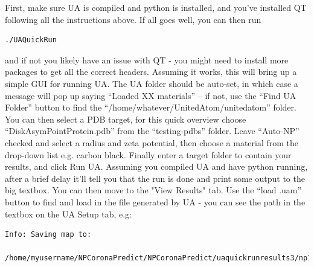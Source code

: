 \documentclass[10pt,a4paper,onecolumn]{report}
\begin{document}
First, make sure UA is compiled and python is installed, and you've installed QT following all the instructions above. 
If all goes well, you can then run
\begin{lstlisting}
./UAQuickRun
\end{lstlisting}
and if not you likely have an issue with QT - you might need to install more packages to get all the correct headers. Assuming it works, this will bring up a simple GUI for running UA. The UA folder should be auto-set, in which case a message will pop up saying ``Loaded XX materials'' -- if not, use the ``Find UA Folder'' button to find the ``/home/whatever/UnitedAtom/unitedatom'' folder. You can then select a PDB target, for this quick overview choose ``DiskAsymPointProtein.pdb'' from the ``testing-pdbs'' folder. Leave ``Auto-NP'' checked and select a radius and zeta potential, then choose a material from the drop-down list e.g. carbon black. Finally enter a target folder to contain your results, and click Run UA. Assuming you compiled UA and have python running, after a brief delay it'll tell you that the run is done and print some output to the big textbox. You can then move to the "View Results" tab. Use the ``load .uam'' button to find and load in the file generated by UA - you can see the path in the textbox on the UA Setup tab, e.g:
\begin{lstlisting}
Info: Saving map to: 

/home/myusername/NPCoronaPredict/NPCoronaPredict/uaquickrunresults3/np1R_10_ZP_0/DiskAsymPointProtein_10_0.uam
\end{lstlisting}
\end{document}
